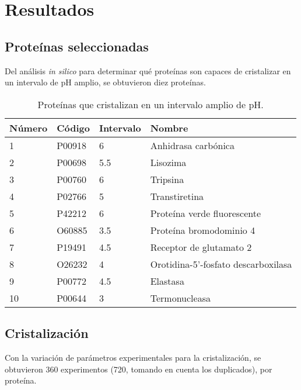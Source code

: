 \chapter{Resultados}

\section{Proteínas seleccionadas} 

Del análisis \emph{in silico} para determinar qué proteínas son capaces de cristalizar en un intervalo de pH amplio, se obtuvieron diez proteínas.

\begin{table}[h]
	\centering
	\begin{tabular}{@{}llll@{}}
		\toprule
		Número & Código & Intervalo       & Nombre                              \\ \midrule
		1      & P00918 & 6               & Anhidrasa carbónica                 \\
		2      & P00698 & 5.5             & Lisozima                            \\
		3      & P00760 & 6               & Tripsina                            \\
		4      & P02766 & 5               & Transtiretina                       \\
		5      & P42212 & 6               & Proteína verde fluorescente         \\
		6      & O60885 & 3.5             & Proteína bromodominio 4             \\
		7      & P19491 & 4.5             & Receptor de glutamato 2             \\
		8      & O26232 & 4               & Orotidina-5’-fosfato descarboxilasa \\
		9      & P00772 & 4.5             & Elastasa                            \\
		10     & P00644 & 3               & Termonucleasa                       \\
		\bottomrule
	\end{tabular}
	\caption[Proteínas que cristalizan en un intervalo amplio de pH]{Proteínas que cristalizan en un intervalo amplio de pH.}
\end{table}


\section{Cristalización}
Con la variación de parámetros experimentales para la cristalización, se obtuvieron \num{360} experimentos (\num{720}, tomando en cuenta los duplicados), por proteína. %

